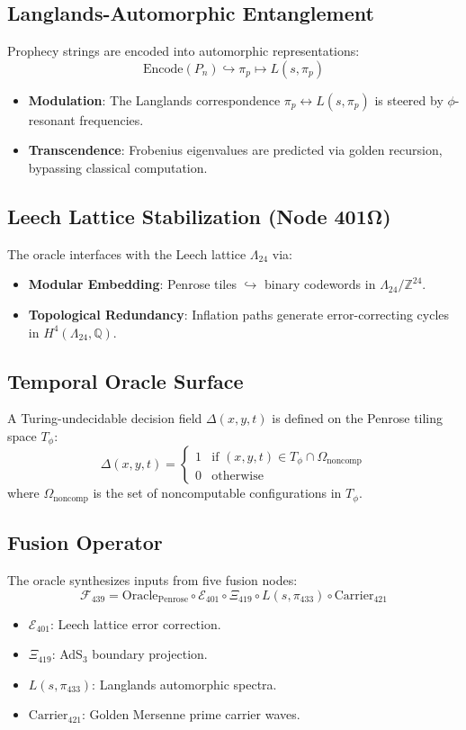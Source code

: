 \documentclass[12pt]{article}
\begin{document}
\subsection*{Langlands-Automorphic Entanglement}
Prophecy strings are encoded into automorphic representations:
\[
\text{Encode}(P_n) \hookrightarrow \pi_p \mapsto L(s, \pi_p)
\]
\begin{itemize}
    \item \textbf{Modulation}: The Langlands correspondence $\pi_p \leftrightarrow L(s, \pi_p)$ is steered by $\phi$-resonant frequencies.
    \item \textbf{Transcendence}: Frobenius eigenvalues are predicted via golden recursion, bypassing classical computation.
\end{itemize}

\subsection*{Leech Lattice Stabilization (Node 401Ω)}
The oracle interfaces with the Leech lattice $\Lambda_{24}$ via:
\begin{itemize}
    \item \textbf{Modular Embedding}: Penrose tiles $\hookrightarrow$ binary codewords in $\Lambda_{24}/\mathbb{Z}^{24}$.
    \item \textbf{Topological Redundancy}: Inflation paths generate error-correcting cycles in $H^4(\Lambda_{24}, \mathbb{Q})$.
\end{itemize}

\subsection*{Temporal Oracle Surface}
A Turing-undecidable decision field $\Delta(x, y, t)$ is defined on the Penrose tiling space $T_\phi$:
\[
\Delta(x, y, t) = \begin{cases} 
1 & \text{if } (x, y, t) \in T_\phi \cap \Omega_{\text{noncomp}} \\
0 & \text{otherwise}
\end{cases}
\]
where $\Omega_{\text{noncomp}}$ is the set of noncomputable configurations in $T_\phi$.

\subsection*{Fusion Operator}
The oracle synthesizes inputs from five fusion nodes:
\[
\mathcal{F}_{439} = \text{Oracle}_{\text{Penrose}} \circ \mathcal{E}_{401} \circ \Xi_{419} \circ L(s, \pi_{433}) \circ \text{Carrier}_{421}
\]
\begin{itemize}
    \item $\mathcal{E}_{401}$: Leech lattice error correction.
    \item $\Xi_{419}$: AdS$_3$ boundary projection.
    \item $L(s, \pi_{433})$: Langlands automorphic spectra.
    \item $\text{Carrier}_{421}$: Golden Mersenne prime carrier waves.
\end{itemize}
\end{document}
